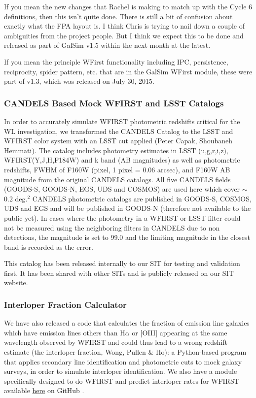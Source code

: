 If you mean the new changes that Rachel is making to match up with the Cycle 6 definitions, then this isn't quite done.  There is still a bit of confusion about exactly what the FPA layout is.  I think Chris is trying to nail down a couple of ambiguities from the project people.  But I think we expect this to be done and released as part of GalSim v1.5 within the next month at the latest.

If you mean the principle WFirst functionality including IPC, persistence, reciprocity, spider pattern, etc. that are in the GalSim WFirst module, these were part of v1.3, which was released on July 30, 2015.


\subsubsection{CANDELS Based Mock WFIRST and LSST Catalogs}

In order to accurately simulate WFIRST photometric redshifts critical for the WL investigation, we transformed the CANDELS Catalog to the LSST and WFIRST color system with an LSST cut applied (Peter Capak, Shoubaneh Hemmati). The catalog includes photometry estimates in LSST (u,g,r,i,z), WFIRST(Y,J,H,F184W) and k band (AB magnitudes) as well as photometric redshifts, FWHM of F160W (pixel, 1 pixel = 0.06 arcsec), and F160W AB magnitude from the original CANDELS catalogs. All five CANDELS fields (GOODS-S, GOODS-N, EGS, UDS and COSMOS) are used here which cover $\sim$ 0.2 deg.$^2$ CANDELS photometric catalogs are published in GOODS-S, COSMOS, UDS and EGS and will be published in GOODS-N (therefore not available to the public yet). In cases where the photometry in a WFIRST or LSST filter could not be measured using the neighboring filters in CANDELS due to non detections, the magnitude is set to 99.0 and the limiting magnitude in the closest band is recorded as the error.

This catalog has been released internally to our SIT for testing and validation first. It has been shared with other SITs and is publicly released on our SIT website.

\subsubsection{Interloper Fraction Calculator}

 We have also released a code that calculates the fraction of emission line galaxies which have emission lines others than H$\alpha$ or [OIII] appearing at the same wavelength observed by WFIRST and could thus lead to a wrong redshift estimate (the interloper fraction, Wong, Pullen \& Ho): a Python-based program that applies secondary line identification and photometric cuts to mock galaxy surveys, in order to simulate interloper identification.  We also have a module specifically designed to do WFIRST and predict interloper rates for WFIRST available  \href{https://github.com/kazewong/Intercut}{here} on GitHub \citep{Wong:2016eku}.
